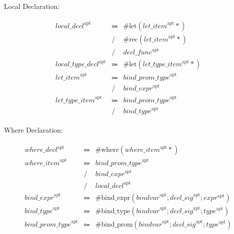 Local Declaration:

\begin{align*}
    \begin{array}{rcll}
        \mathit{local\_decl}^\mathrm{apt}
        &\Coloneq &\mathrm{\#let}(\mathit{let\_item}^\mathrm{apt}{*}) \\
        &\mathrel{/} &\mathrm{\#rec}(\mathit{let\_item}^\mathrm{apt}{*}) \\
        &\mathrel{/} &\mathit{decl\_func}^\mathrm{apt} \\
        \mathit{local\_type\_decl}^\mathrm{apt}
        &\Coloneq &\mathrm{\#let}(\mathit{let\_type\_item}^\mathrm{apt}{*}) \\
        \mathit{let\_item}^\mathrm{apt}
        &\Coloneq &\mathit{bind\_prom\_type}^\mathrm{apt} \\
        &\mathrel{/} &\mathit{bind\_expr}^\mathrm{apt} \\
        \mathit{let\_type\_item}^\mathrm{apt}
        &\Coloneq &\mathit{bind\_prom\_type}^\mathrm{apt} \\
        &\mathrel{/} &\mathit{bind\_type}^\mathrm{apt}
    \end{array}
\end{align*}

Where Declaration:

\begin{align*}
    \begin{array}{rcll}
        \mathit{where\_decl}^\mathrm{apt}
        &\Coloneq &\mathrm{\#where}(\mathit{where\_item}^\mathrm{apt}{*}) \\
        \mathit{where\_item}^\mathrm{apt}
        &\Coloneq &\mathit{bind\_prom\_type}^\mathrm{apt} \\
        &\mathrel{/} &\mathit{bind\_expr}^\mathrm{apt} \\
        &\mathrel{/} &\mathit{local\_decl}^\mathrm{apt} \\
        \mathit{bind\_expr}^\mathrm{apt}
        &\Coloneq &\mathrm{\#bind\_expr}(\mathit{bindvar}^\mathrm{apt}; \mathit{decl\_sig}^\mathrm{apt}; \mathit{expr}^\mathrm{apt}) \\
        \mathit{bind\_type}^\mathrm{apt}
        &\Coloneq &\mathrm{\#bind\_type}(\mathit{bindvar}^\mathrm{apt}; \mathit{decl\_sig}^\mathrm{apt}; \mathit{type}^\mathrm{apt}) \\
        \mathit{bind\_prom\_type}^\mathrm{apt}
        &\Coloneq &\mathrm{\#bind\_prom}(\mathit{bindvar}^\mathrm{apt}; \mathit{decl\_sig}^\mathrm{apt}; \mathit{type}^\mathrm{apt})
    \end{array}
\end{align*}

